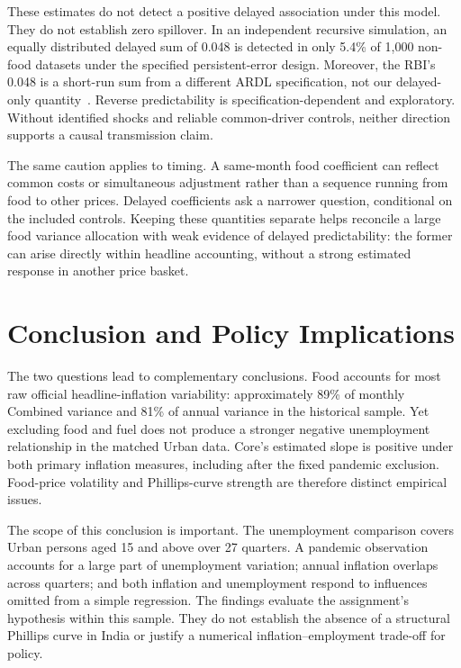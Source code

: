 \documentclass[11pt,a4paper]{article}
\begin{document}
These estimates do not detect a positive delayed association under this model. They do not establish zero spillover. In an independent recursive simulation, an equally distributed delayed sum of 0.048 is detected in only 5.4\% of 1,000 non-food datasets under the specified persistent-error design. Moreover, the RBI's 0.048 is a short-run sum from a different ARDL specification, not our delayed-only quantity~\cite{patra2024}. Reverse predictability is specification-dependent and exploratory. Without identified shocks and reliable common-driver controls, neither direction supports a causal transmission claim.

The same caution applies to timing. A same-month food coefficient can reflect common costs or simultaneous adjustment rather than a sequence running from food to other prices. Delayed coefficients ask a narrower question, conditional on the included controls. Keeping these quantities separate helps reconcile a large food variance allocation with weak evidence of delayed predictability: the former can arise directly within headline accounting, without a strong estimated response in another price basket.

\clearpage
\section{Conclusion and Policy Implications}

The two questions lead to complementary conclusions. Food accounts for most raw official headline-inflation variability: approximately 89\% of monthly Combined variance and 81\% of annual variance in the historical sample. Yet excluding food and fuel does not produce a stronger negative unemployment relationship in the matched Urban data. Core's estimated slope is positive under both primary inflation measures, including after the fixed pandemic exclusion. Food-price volatility and Phillips-curve strength are therefore distinct empirical issues.

The scope of this conclusion is important. The unemployment comparison covers Urban persons aged 15 and above over 27 quarters. A pandemic observation accounts for a large part of unemployment variation; annual inflation overlaps across quarters; and both inflation and unemployment respond to influences omitted from a simple regression. The findings evaluate the assignment's hypothesis within this sample. They do not establish the absence of a structural Phillips curve in India or justify a numerical inflation--employment trade-off for policy.
\end{document}
